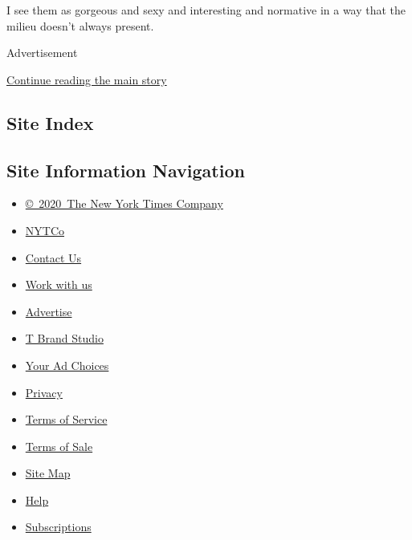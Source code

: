 I see them as gorgeous and sexy and interesting and normative in a way
that the milieu doesn't always present.

Advertisement

\protect\hyperlink{after-bottom}{Continue reading the main story}

\hypertarget{site-index}{%
\subsection{Site Index}\label{site-index}}

\hypertarget{site-information-navigation}{%
\subsection{Site Information
Navigation}\label{site-information-navigation}}

\begin{itemize}
\tightlist
\item
  \href{https://help.nytimes.com/hc/en-us/articles/115014792127-Copyright-notice}{©~2020~The
  New York Times Company}
\end{itemize}

\begin{itemize}
\tightlist
\item
  \href{https://www.nytco.com/}{NYTCo}
\item
  \href{https://help.nytimes.com/hc/en-us/articles/115015385887-Contact-Us}{Contact
  Us}
\item
  \href{https://www.nytco.com/careers/}{Work with us}
\item
  \href{https://nytmediakit.com/}{Advertise}
\item
  \href{http://www.tbrandstudio.com/}{T Brand Studio}
\item
  \href{https://www.nytimes.com/privacy/cookie-policy\#how-do-i-manage-trackers}{Your
  Ad Choices}
\item
  \href{https://www.nytimes.com/privacy}{Privacy}
\item
  \href{https://help.nytimes.com/hc/en-us/articles/115014893428-Terms-of-service}{Terms
  of Service}
\item
  \href{https://help.nytimes.com/hc/en-us/articles/115014893968-Terms-of-sale}{Terms
  of Sale}
\item
  \href{https://spiderbites.nytimes.com}{Site Map}
\item
  \href{https://help.nytimes.com/hc/en-us}{Help}
\item
  \href{https://www.nytimes.com/subscription?campaignId=37WXW}{Subscriptions}
\end{itemize}
